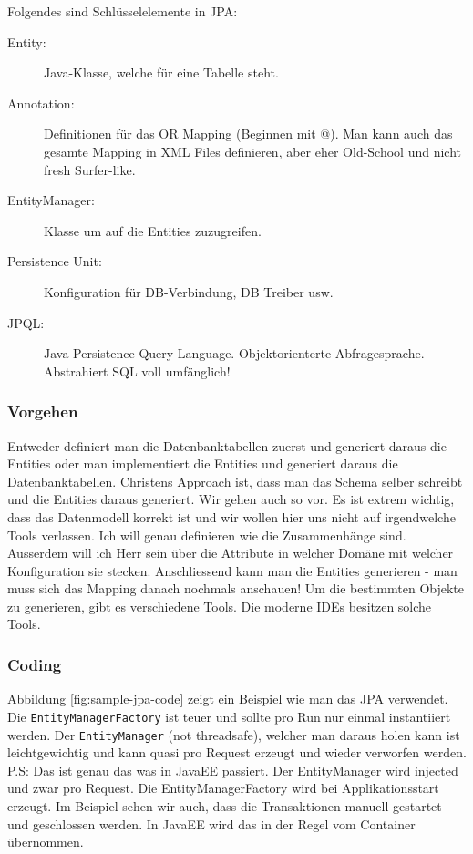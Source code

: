 \noindent
Folgendes sind Schlüsselelemente in JPA:
\begin{description}
	\item[Entity:] Java-Klasse, welche für eine Tabelle steht.
	\item[Annotation:] Definitionen für das OR Mapping (Beginnen mit @). Man kann auch das gesamte Mapping in XML Files definieren, aber eher Old-School und nicht fresh Surfer-like.
	\item[EntityManager:] Klasse um auf die Entities zuzugreifen.
	\item[Persistence Unit:] Konfiguration für DB-Verbindung, DB Treiber usw.
	\item[JPQL:] Java Persistence Query Language. Objektorienterte Abfragesprache. Abstrahiert SQL voll umfänglich!
\end{description}

\subsubsection{Vorgehen}
Entweder definiert man die Datenbanktabellen zuerst und generiert daraus die Entities oder man implementiert die Entities und generiert daraus die Datenbanktabellen. Christens Approach ist, dass man das Schema selber schreibt und die Entities daraus generiert. Wir gehen auch so vor. Es ist extrem wichtig, dass das Datenmodell korrekt ist und wir wollen hier uns nicht auf irgendwelche Tools verlassen. Ich will genau definieren wie die Zusammenhänge sind. Ausserdem will ich Herr sein über die Attribute in welcher Domäne mit welcher Konfiguration sie stecken. Anschliessend kann man die Entities generieren - man muss sich das Mapping danach nochmals anschauen!
Um die bestimmten Objekte zu generieren, gibt es verschiedene Tools. Die moderne IDEs besitzen solche Tools.

\subsubsection{Coding}
Abbildung \ref{fig:sample-jpa-code} zeigt ein Beispiel wie man das JPA verwendet. Die \texttt{EntityManagerFactory} ist teuer und sollte pro Run nur einmal instantiiert werden. Der \texttt{EntityManager} (not threadsafe), welcher man daraus holen kann ist leichtgewichtig und kann quasi pro Request erzeugt und wieder verworfen werden. P.S: Das ist genau das was in JavaEE passiert. Der EntityManager wird injected und zwar pro Request. Die EntityManagerFactory wird bei Applikationsstart erzeugt. Im Beispiel sehen wir auch, dass die Transaktionen manuell gestartet und geschlossen werden. In JavaEE wird das in der Regel vom Container übernommen. 

